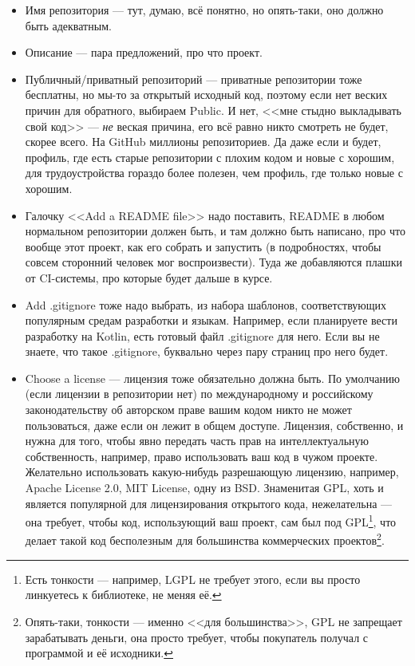 \documentclass{../text-style}
\begin{document}
\begin{itemize}
    \item Имя репозитория --- тут, думаю, всё понятно, но опять-таки, оно должно быть адекватным.
    \item Описание --- пара предложений, про что проект.
    \item Публичный/приватный репозиторий --- приватные репозитории тоже бесплатны, но мы-то за открытый исходный код, поэтому если нет веских причин для обратного, выбираем Public. И нет, <<мне стыдно выкладывать свой код>> --- \emph{не} веская причина, его всё равно никто смотреть не будет, скорее всего. На GitHub миллионы репозиториев. Да даже если и будет, профиль, где есть старые репозитории с плохим кодом и новые с хорошим, для трудоустройства гораздо более полезен, чем профиль, где только новые с хорошим.
    \item Галочку <<Add a README file>> надо поставить, README в любом нормальном репозитории должен быть, и там должно быть написано, про что вообще этот проект, как его собрать и запустить (в подробностях, чтобы совсем сторонний человек мог воспроизвести). Туда же добавляются плашки от CI-системы, про которые будет дальше в курсе.
    \item Add .gitignore тоже надо выбрать, из набора шаблонов, соответствующих популярным средам разработки и языкам. Например, если планируете вести разработку на Kotlin, есть готовый файл .gitignore для него. Если вы не знаете, что такое .gitignore, буквально через пару страниц про него будет.
    \item Choose a license --- лицензия тоже обязательно должна быть. По умолчанию (если лицензии в репозитории нет) по международному и российскому законодательству об авторском праве вашим кодом никто не может пользоваться, даже если он лежит в общем доступе. Лицензия, собственно, и нужна для того, чтобы явно передать часть прав на интеллектуальную собственность, например, право использовать ваш код в чужом проекте. Желательно использовать какую-нибудь разрешающую лицензию, например, Apache License 2.0, MIT License, одну из BSD. Знаменитая GPL, хоть и является популярной для лицензирования открытого кода, нежелательна --- она требует, чтобы код, использующий ваш проект, сам был под GPL\footnote{Есть тонкости --- например, LGPL не требует этого, если вы просто линкуетесь к библиотеке, не меняя её.}, что делает такой код бесполезным для большинства коммерческих проектов\footnote{Опять-таки, тонкости --- именно <<для большинства>>, GPL не запрещает зарабатывать деньги, она просто требует, чтобы покупатель получал с программой и её исходники.}.
\end{itemize}
\end{document}
